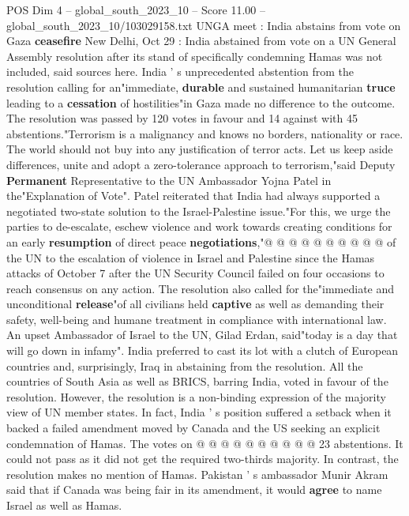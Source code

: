 \begin{textsample}{POS Dim 4 – global\_south\_2023\_10 – Score 11.00 – global\_south\_2023\_10/103029158.txt}  \label{ex:f4_pos_437}
UNGA meet : India abstains from vote on Gaza \textbf{ceasefire} New Delhi, Oct 29 : India abstained from vote on a UN General Assembly resolution after its stand of specifically condemning Hamas was not included, said sources here.
India ' s unprecedented abstention from the resolution calling for an"immediate, \textbf{durable} and sustained humanitarian \textbf{truce} leading to a \textbf{cessation} of hostilities"in Gaza made no difference to the outcome.
The resolution was passed by 120 votes in favour and 14 against with 45 abstentions."Terrorism is a malignancy and knows no borders, nationality or race.
The world should not buy into any justification of terror acts.
Let us keep aside differences, unite and adopt a zero-tolerance approach to terrorism,"said Deputy \textbf{Permanent} Representative to the UN Ambassador Yojna Patel in the"Explanation of Vote".
Patel reiterated that India had always supported a negotiated two-state solution to the Israel-Palestine issue."For this, we urge the parties to de-escalate, eschew violence and work towards creating conditions for an early \textbf{resumption} of direct peace \textbf{negotiations},"@ @ @ @ @ @ @ @ @ @ of the UN to the escalation of violence in Israel and Palestine since the Hamas attacks of October 7 after the UN Security Council failed on four occasions to reach consensus on any action.
The resolution also called for the"immediate and unconditional \textbf{release}"of all civilians held \textbf{captive} as well as demanding their safety, well-being and humane treatment in compliance with international law.
An upset Ambassador of Israel to the UN, Gilad Erdan, said"today is a day that will go down in infamy".
India preferred to cast its lot with a clutch of European countries and, surprisingly, Iraq in abstaining from the resolution.
All the countries of South Asia as well as BRICS, barring India, voted in favour of the resolution.
However, the resolution is a non-binding expression of the majority view of UN member states.
In fact, India ' s position suffered a setback when it backed a failed amendment moved by Canada and the US seeking an explicit condemnation of Hamas.
The votes on @ @ @ @ @ @ @ @ @ @ 23 abstentions.
It could not pass as it did not get the required two-thirds majority.
In contrast, the resolution makes no mention of Hamas.
Pakistan ' s ambassador Munir Akram said that if Canada was being fair in its amendment, it would \textbf{agree} to name Israel as well as Hamas.

\end{textsample}
